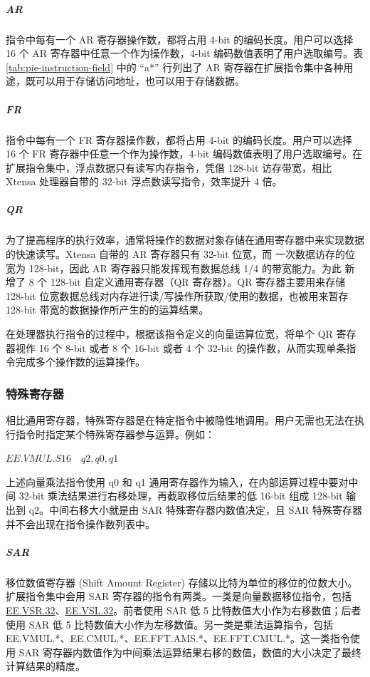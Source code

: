 \documentclass[main\_\_CN.tex]{subfiles}
\begin{document}
\subparagraph{AR}

指令中每有一个 AR 寄存器操作数，都将占用 4-bit 的编码长度。用户可以选择 16 个 AR 寄存器中任意一个作为操作数，4-bit 编码数值表明了用户选取编号。表 \ref{tab:pie-instruction-field} 中的 “a*” 行列出了
AR 寄存器在扩展指令集中各种用途，既可以用于存储访问地址，也可以用于存储数据。

\subparagraph{FR}

指令中每有一个 FR 寄存器操作数，都将占用 4-bit 的编码长度。用户可以选择 16 个 FR 寄存器中任意一个作为操作数，4-bit 编码数值表明了用户选取编号。在 \chipname{} 扩展指令集中，浮点数据只有读写内存指令，凭借 128-bit 访存带宽，相比 Xtensa 处理器自带的 32-bit 浮点数读写指令，效率提升 4 倍。

\subparagraph{QR}

为了提高程序的执行效率，通常将操作的数据对象存储在通用寄存器中来实现数据的快速读写。Xtensa 自带的 AR 寄存器只有 32-bit 位宽，而 \chipname{} 一次数据访存的位宽为 128-bit，因此 AR 寄存器只能发挥现有数据总线 1/4 的带宽能力。为此 \chipname{} 新增了 8 个 128-bit 自定义通用寄存器（QR 寄存器）。QR 寄存器主要用来存储 128-bit 位宽数据总线对内存进行读/写操作所获取/使用的数据，也被用来暂存 128-bit 带宽的数据操作所产生的的运算结果。

在处理器执行指令的过程中，根据该指令定义的向量运算位宽，将单个 QR 寄存器视作 16 个 8-bit 或者 8 个 16-bit 或者 4 个 32-bit 的操作数，从而实现单条指令完成多个操作数的运算操作。

\subsubsection{特殊寄存器}
\label{sec:pie-spec-reg}

相比通用寄存器，特殊寄存器是在特定指令中被隐性地调用。用户无需也无法在执行指令时指定某个特殊寄存器参与运算。例如：

\begin{center}
    $\hyperref[instruction:EEVMULS16]{EE.VMUL.S16} \hspace{1em} q2, q0, q1$
\end{center}

上述向量乘法指令使用 q0 和 q1 通用寄存器作为输入，在内部运算过程中要对中间 32-bit 乘法结果进行右移处理，再截取移位后结果的低 16-bit 组成 128-bit 输出到 q2。中间右移大小就是由 SAR 特殊寄存器内数值决定，且 SAR 特殊寄存器并不会出现在指令操作数列表中。

\subparagraph{SAR}

移位数值寄存器 (Shift Amount Register) 存储以比特为单位的移位的位数大小。\chipname{} 扩展指令集中会用 SAR 寄存器的指令有两类。一类是向量数据移位指令，包括 \hyperref[instruction:EEVSR32]{EE.VSR.32}、\hyperref[instruction:EEVSL32]{EE.VSL.32}。前者使用 SAR 低 5 比特数值大小作为右移数值；后者使用 SAR 低 5 比特数值大小作为左移数值。另一类是乘法运算指令，包括 EE.VMUL.*、EE.CMUL.*、EE.FFT.AMS.*、EE.FFT.CMUL.*。这一类指令使用 SAR 寄存器内数值作为中间乘法运算结果右移的数值，数值的大小决定了最终计算结果的精度。
\end{document}
